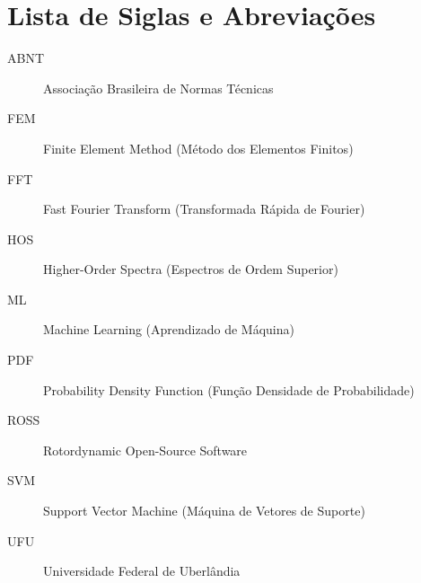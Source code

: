 
\listoffigures
\cleardoublepage

\listoftables
\cleardoublepage

\chapter*{Lista de Siglas e Abreviações}

\begin{description}
    \item[ABNT] Associação Brasileira de Normas Técnicas
    \item[FEM] Finite Element Method (Método dos Elementos Finitos)
    \item[FFT] Fast Fourier Transform (Transformada Rápida de Fourier)
    \item[HOS] Higher-Order Spectra (Espectros de Ordem Superior)
    \item[ML] Machine Learning (Aprendizado de Máquina)
    \item[PDF] Probability Density Function (Função Densidade de Probabilidade)
    \item[ROSS] Rotordynamic Open-Source Software
    \item[SVM] Support Vector Machine (Máquina de Vetores de Suporte)
    \item[UFU] Universidade Federal de Uberlândia
\end{description}

\cleardoublepage
